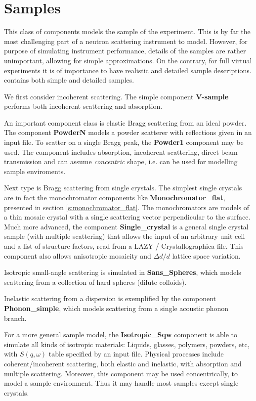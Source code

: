 \chapter{Samples}
\label{c:samples}

This class of components models the sample of the experiment.
This is by far the most challenging part of a neutron scattering
instrument to model. However, for purpose of simulating
instrument performance, details of the samples are rather unimportant,
allowing for simple approximations. On the contrary, for full
virtual experiments it is of importance to have realistic and
detailed sample descriptions. \MCS contains both simple and detailed
samples.

We first consider incoherent scattering. The simple component {\bf V-sample}
performs both incoherent scattering and absorption.

An important component class is elastic Bragg scattering from an ideal powder.
The component {\bf PowderN} models a powder scatterer with reflections
given in an input file. To scatter on a single Bragg peak, the {\bf Powder1} component may be used.
The component includes absorption, incoherent scattering, direct beam
transmission and can assume \emph{concentric} shape, i.e. can be used
for modelling sample enviroments.

Next type is Bragg scattering from single crystals.
The simplest single crystals are in fact the monochromator components
like {\bf Monochromator\_flat}, presented in section \ref{s:monochromator_flat}.
The monochromators are models of a thin mosaic crystal
with a single scattering vector perpendicular to the surface.
Much more advanced, the component {\bf Single\_crystal}
is a general single crystal sample (with multiple scattering) that allows
the input of an arbitrary unit cell and a list of structure factors, read
from a LAZY / Crystallographica file.
This component also allows anisotropic mosaicity
and $\Delta d/d$ lattice space variation.

Isotropic small-angle scattering is simulated in {\bf Sans\_Spheres},
which models scattering from a collection of hard spheres (dilute colloids).

Inelastic scattering from a dispersion is exemplified by
the component {\bf Phonon\_simple}, which models
scattering from a single acoustic phonon branch.

For a more general sample model, the {\bf Isotropic\_Sqw} component
is able to simulate all kinds of isotropic materials:
Liquids, glasses, polymers, powders, etc, with $S(q,\omega)$ table
specified by an input file.
Physical processes include coherent/incoherent scattering,
both elastic and inelastic, with absorption and multiple scattering.
Moreover, this component may be used concentrically,
to model a sample environment.
Thus it may handle most samples except single crystals.


